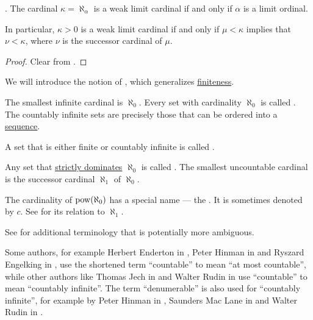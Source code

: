 \begin{corollary}\label{thm:weak_limit_cardinal_equivalences}.
  The cardinal \( \kappa = \aleph_\alpha \) is a weak limit cardinal if and only if \( \alpha \) is a limit ordinal.

  In particular, \( \kappa > 0 \) is a weak limit cardinal if and only if \( \mu < \kappa \) implies that \( \nu < \kappa \), where \( \nu \) is the successor cardinal of \( \mu \).
\end{corollary}
\begin{proof}
  Clear from .
\end{proof}

\begin{definition}\label{def:set_countability}
  We will introduce the notion of , which generalizes \hyperref[def:set_finiteness]{finiteness}.

  \begin{thmenum}
     The smallest infinite cardinal is \hyperref[def:aleph_hierarchy]{\( \aleph_0 \)}. Every set with cardinality \( \aleph_0 \) is called . The countably infinite sets are precisely those that can be ordered into a \hyperref[def:sequence]{sequence}.

     A set that is either finite or countably infinite is called .

     Any set that \hyperref[def:equinumerosity]{strictly dominates} \( \aleph_0 \) is called . The smallest uncountable cardinal is the successor cardinal \( \aleph_1 \) of \( \aleph_0 \).

     The cardinality of \( \operatorname{pow}(\aleph_0) \) has a special name --- the . It is sometimes denoted by \( c \). See  for its relation to \( \aleph_1 \).
  \end{thmenum}

  See  for additional terminology that is potentially more ambiguous.
\end{definition}

\begin{remark}\label{rem:countability_etymology}
  Some authors, for example Herbert Enderton in \cite[159]{Enderton1977Sets}, Peter Hinman in \cite[def. 6.2.32(v)]{Hinman2005} and Ryszard Engelking in \cite[4]{Engelking1989}, use the shortened term \enquote{countable} to mean \enquote{at most countable}, while other authors like Thomas Jech in \cite[30]{Jech2003} and Walter Rudin in \cite[def. 2.4(c)]{Rudin1976Principles} use \enquote{countable} to mean \enquote{countably infinite}. The term \enquote{denumerable} is also used for \enquote{countably infinite}, for example by Peter Hinman in \cite[def. 6.2.32(iv)]{Hinman2005}, Saunders Mac Lane in \cite[123]{MacLane1998} and Walter Rudin in \cite[def. 2.4]{Rudin1976Principles}.
\end{remark}


